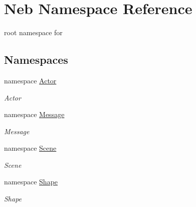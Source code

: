\hypertarget{namespaceNeb}{\section{\-Neb \-Namespace \-Reference}
\label{namespaceNeb}
}


root namespace for   


\subsection*{\-Namespaces}
\begin{DoxyCompactItemize}
\item 
namespace \hyperlink{namespaceNeb_1_1Actor}{\-Actor}
\begin{DoxyCompactList}\small\item\em \-Actor \end{DoxyCompactList}\item 
namespace \hyperlink{namespaceNeb_1_1Message}{\-Message}
\begin{DoxyCompactList}\small\item\em \-Message \end{DoxyCompactList}\item 
namespace \hyperlink{namespaceNeb_1_1Scene}{\-Scene}
\begin{DoxyCompactList}\small\item\em \-Scene \end{DoxyCompactList}\item 
namespace \hyperlink{namespaceNeb_1_1Shape}{\-Shape}
\begin{DoxyCompactList}\small\item\em \-Shape \end{DoxyCompactList}\end{DoxyCompactItemize}
